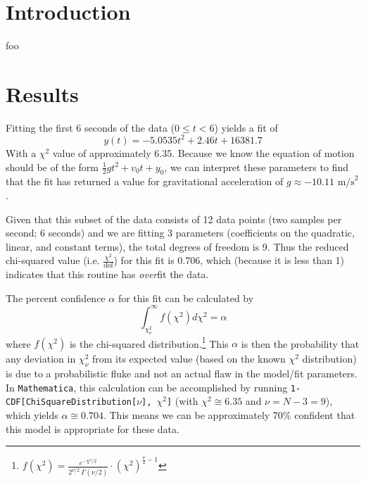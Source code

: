 \documentclass{article}
\author{\hwauthor}
\title{\hwtitle}
\date{\hwdate}
\begin{document}
\maketitle
\thispagestyle{fancy}

\section{Introduction}

foo

\section{Results}

\bigskip
{}
\medskip

Fitting the first 6 seconds of the data ($0\leq t < 6$) yields a fit of \begin{equation*}
    y(t) = -5.0535t^2 + 2.46 t + 16381.7
\end{equation*}
With a $\chi^2$ value of approximately 6.35. Because we know the equation of motion should be of the form $\displaystyle \frac{1}{2}gt^2 + v_0 t + y_0$, we can interpret these parameters to find that the fit has returned a value for gravitational acceleration of $g\approx-10.11\text{ m/s}^2$.

Given that this subset of the data consists of 12 data points (two samples per second; 6 seconds) and we are fitting 3 parameters (coefficients on the quadratic, linear, and constant terms), the total degrees of freedom is 9. Thus the reduced chi-squared value (i.e. $\frac{\chi^2}{\text{dof}}$) for this fit is 0.706, which (because it is less than 1) indicates that this routine has \emph{over}fit the data.

The percent confidence $\alpha$ for this fit can be calculated by \begin{equation*}
    \int_{\chi_\nu^2}^\infty f(\chi^2) d\chi^2 = \alpha
\end{equation*} where $f(\chi^2)$ is the chi-squared distribution.\footnote{$\displaystyle f(\chi^2) = \frac{e^{-\chi^2/2}}{2^{\nu/2}\ \Gamma(\nu/2)}\cdot\left(\chi^2\right)^{\frac{\nu}{2}-1}$} This $\alpha$ is then the probability that any deviation in $\chi_\nu^2$ from its expected value (based on the known $\chi^2$ distribution) is due to a probabilistic fluke and not an actual flaw in the model/fit parameters. In \texttt{Mathematica}, this calculation can be accomplished by running \verb|1-CDF[ChiSquareDistribution[|$\nu$\verb|], |$\chi^2$\verb|]| (with $\chi^2 \cong 6.35$ and $\nu=N-3=9$), which yields $\alpha\cong0.704$. This means we can be approximately 70\% confident that this model is appropriate for these data.
\end{document}
